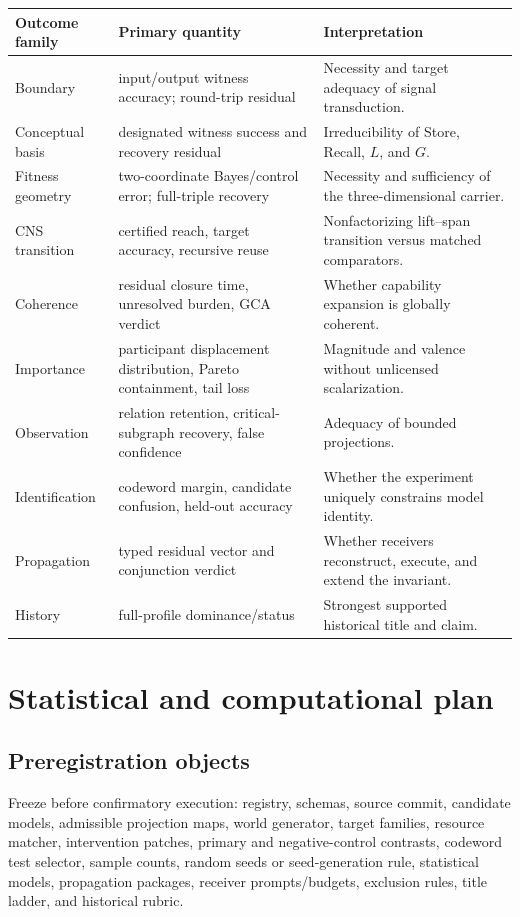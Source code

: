 \documentclass[11pt]{article}
\begin{document}
\begin{longtable}{p{}p{}p{}}
\toprule
\textbf{Outcome family} & \textbf{Primary quantity} & \textbf{Interpretation}\\
\midrule\endhead
Boundary & input/output witness accuracy; round-trip residual & Necessity and target adequacy of signal transduction.\\
Conceptual basis & designated witness success and recovery residual & Irreducibility of Store, Recall, $L$, and $G$.\\
Fitness geometry & two-coordinate Bayes/control error; full-triple recovery & Necessity and sufficiency of the three-dimensional carrier.\\
CNS transition & certified reach, target accuracy, recursive reuse & Nonfactorizing lift--span transition versus matched comparators.\\
Coherence & residual closure time, unresolved burden, GCA verdict & Whether capability expansion is globally coherent.\\
Importance & participant displacement distribution, Pareto containment, tail loss & Magnitude and valence without unlicensed scalarization.\\
Observation & relation retention, critical-subgraph recovery, false confidence & Adequacy of bounded projections.\\
Identification & codeword margin, candidate confusion, held-out accuracy & Whether the experiment uniquely constrains model identity.\\
Propagation & typed residual vector and conjunction verdict & Whether receivers reconstruct, execute, and extend the invariant.\\
History & full-profile dominance/status & Strongest supported historical title and claim.\\
\bottomrule
\end{longtable}

\section{Statistical and computational plan}

\subsection{Preregistration objects}

Freeze before confirmatory execution: registry, schemas, source commit, candidate models, admissible projection maps, world generator, target families, resource matcher, intervention patches, primary and negative-control contrasts, codeword test selector, sample counts, random seeds or seed-generation rule, statistical models, propagation packages, receiver prompts/budgets, exclusion rules, title ladder, and historical rubric.
\end{document}
